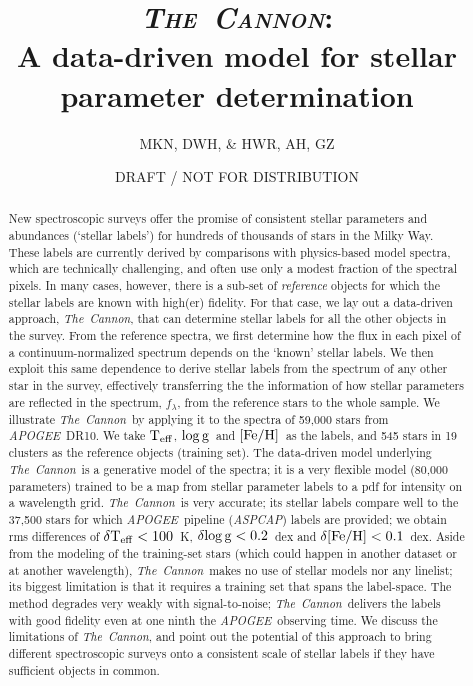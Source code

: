 \documentclass[12pt, preprint]{aastex}
\newcommand{\teff}{\mbox{$\rm T_{eff}$}}
\newcommand{\feh}{\mbox{$\rm [Fe/H]$}}
\newcommand{\logg}{\mbox{$\rm \log g$}}
\newcommand{\tc}{\textsl{The~Cannon}}
\newcommand{\apogee}{\textsl{APOGEE}}
\newcommand{\aspcap}{\textsl{ASPCAP}}
\begin{document}
\title{\textsc{\tc:}\\ A data-driven model for stellar parameter determination}
\author{
  MKN,
  DWH,
  \&
  HWR,
  AH, GZ} 
\date{DRAFT / NOT FOR DISTRIBUTION}



\begin{abstract}%
New spectroscopic surveys offer the
promise of consistent stellar parameters and
abundances (`stellar labels') for hundreds of thousands of
stars in the Milky Way. These labels are currently derived
by comparisons with physics-based model spectra,
which are technically challenging, and often use only a modest fraction of the
spectral pixels.  In many cases, however, there is a sub-set of
\emph{reference} objects for which the stellar labels
are known with high(er) fidelity. For that case,
we lay out a data-driven approach, \tc,
that can determine stellar labels for all the other objects
in the survey. From the reference spectra, we first determine how
the flux in each pixel of a continuum-normalized spectrum
depends on the `known' stellar labels. We then exploit this
same dependence to derive stellar labels from the spectrum
of any other star in the survey, effectively transferring the
the information of how stellar parameters are reflected in
the spectrum, $f_\lambda$, from the reference stars to the whole sample. We illustrate \tc\ by applying it
to the spectra of 59,000 stars from \apogee\ DR10.
We take \teff, \logg\ and \feh\ as the labels, and 545 stars in 19 clusters
as the reference objects (training set).
The data-driven model underlying \tc\ is a generative model of the
spectra; it is a very flexible model (80,000 parameters) trained to be
a map from stellar parameter labels to a pdf for intensity on a wavelength
grid. \tc\ is very accurate; its stellar labels compare well to the 
37,500 stars for which \apogee\ pipeline (\aspcap) labels are provided; we obtain rms differences of $\delta\teff< 100$~K,
$\delta\logg< 0.2$~dex and $\delta\feh< 0.1$~dex.
Aside from the modeling of the training-set stars (which could happen
in another dataset or at another wavelength), \tc\ makes no use of
stellar models nor any linelist; its biggest limitation is that it requires a
training set that spans the label-space.
The method degrades very weakly with signal-to-noise; \tc\ delivers
the labels with good fidelity even at one ninth the \apogee\ observing time.
We discuss the limitations of \tc, and point
out the potential of this approach to bring different spectroscopic
surveys onto a consistent scale of stellar labels if they have
sufficient objects in common. 
\end{abstract}
\end{document}
